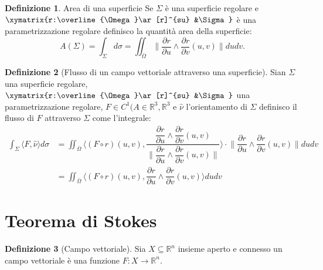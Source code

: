 \documentclass[leqno]{article}
\theoremstyle{definition}
\newtheorem{definition}{Definizione}[section]
\numberwithin{equation}{section}
\theoremstyle{remark}
\begin{document}
	\begin{definition}{Area di una superficie}
		Se $\Sigma$ è una superficie regolare e $\xymatrix{r:\overline{\Omega}\ar[r]^{su} &\Sigma}$ è una parametrizzazione regolare definisco la quantità area della superficie:
		\begin{equation}
			A(\Sigma)=\int_{\Sigma}d \sigma = \iint_{\overline{\Omega}}\lVert \dfrac{\partial r}{\partial u}\wedge \dfrac{\partial r}{\partial v}(u,v)\rVert du dv.
		\end{equation}
	\end{definition}
	
	\begin{definition}[Flusso di un campo vettoriale attraverso una superficie]
		Sian $\Sigma$ una superficie regolare, $\xymatrix{r:\overline{\Omega}\ar[r]^{su} &\Sigma}$ una parametrizzazione regolare, $F\in C^1(A\in \mathbb{R}^3, \mathbb{R}^3$ e $\hat{\nu}$ l'orientamento di $\Sigma$ definisco il flusso di $F$ attraverso $\Sigma$ come l'integrale: 
		\begin{equation}
			\begin{aligned}
				\int_{\Sigma} \langle F, \hat{\nu}\rangle d \sigma &= \iint_{\overline{\Omega}}\langle \left(F \circ r\right) (u,v),\dfrac{ \dfrac{\partial r}{\partial u}\wedge \dfrac {\partial r}{\partial v} (u,v) }{\lVert \dfrac{\partial r}{\partial u}\wedge \dfrac{\partial r}{\partial v} (u,v) \rVert}\rangle \cdot  \lVert \dfrac{\partial r}{\partial u}\wedge \dfrac{\partial r}{\partial v} (u,v) \rVert dudv \\ &=\iint_{\overline{\Omega}}\langle \left(F \circ r\right) (u,v), \dfrac{\partial r}{\partial u}\wedge \dfrac {\partial r}{\partial v} (u,v) \rangle dudv
			\end{aligned}
		\end{equation}
		\end {definition}
		
		\section{Teorema di Stokes}
		
		
		\begin{definition}[Campo vettoriale]
			Sia $X \subseteq \mathbb{R}^n$ insieme aperto e connesso un campo vettoriale è una funzione $F:X \to \mathbb{R}^n$.
		\end{definition}
		
\end{document}
